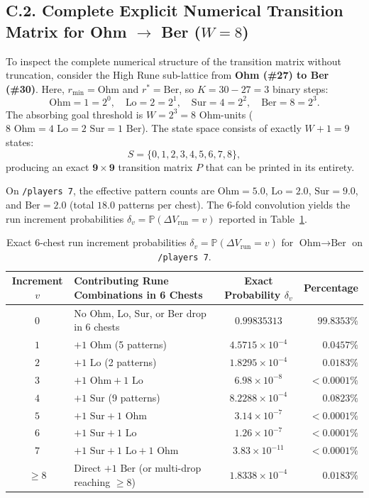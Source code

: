 \documentclass[11pt,reqno]{amsart}
\theoremstyle{definition}
\begin{document}
\subsection{C.2. Complete Explicit Numerical Transition Matrix for Ohm $\to$ Ber ($W = 8$)}
To inspect the complete numerical structure of the transition matrix without truncation, consider the High Rune sub-lattice from \textbf{Ohm (\#27) to Ber (\#30)}. Here, $r_{\min} = \text{Ohm}$ and $r^* = \text{Ber}$, so $K = 30 - 27 = 3$ binary steps:
\[
    \text{Ohm} = 1 = 2^0, \quad \text{Lo} = 2 = 2^1, \quad \text{Sur} = 4 = 2^2, \quad \text{Ber} = 8 = 2^3.
\]
The absorbing goal threshold is $W = 2^3 = 8$ Ohm-units ($8\text{ Ohm} = 4\text{ Lo} = 2\text{ Sur} = 1\text{ Ber}$). The state space consists of exactly $W + 1 = 9$ states:
\[
    S = \{0, 1, 2, 3, 4, 5, 6, 7, 8\},
\]
producing an exact $\mathbf{9 \times 9}$ transition matrix $P$ that can be printed in its entirety.

On \texttt{/players~7}, the effective pattern counts are $\text{Ohm} = 5.0$, $\text{Lo} = 2.0$, $\text{Sur} = 9.0$, and $\text{Ber} = 2.0$ (total $18.0$ patterns per chest). The $6$-fold convolution yields the run increment probabilities $\delta_v = \mathbb{P}(\Delta V_{\text{run}} = v)$ reported in Table~\ref{tab:app_ohm_deltas}.

\begin{table}[htbp]
\centering
\caption{Exact $6$-chest run increment probabilities $\delta_v = \mathbb{P}(\Delta V_{\text{run}} = v)$ for $\text{Ohm}\to\text{Ber}$ on \texttt{/players~7}.}
\label{tab:app_ohm_deltas}
\footnotesize
\begin{tabular}{@{}c l c r@{}}
\toprule
Increment $v$ & Contributing Rune Combinations in 6 Chests & Exact Probability $\delta_v$ & Percentage \\
\midrule
$0$ & No Ohm, Lo, Sur, or Ber drop in 6 chests & $0.99835313$ & $99.8353\%$ \\
$1$ & $+1\text{ Ohm}$ (5 patterns)              & $4.5715 \times 10^{-4}$ & $0.0457\%$ \\
$2$ & $+1\text{ Lo}$ (2 patterns)                & $1.8295 \times 10^{-4}$ & $0.0183\%$ \\
$3$ & $+1\text{ Ohm} + 1\text{ Lo}$             & $6.98 \times 10^{-8}$   & $< 0.0001\%$ \\
$4$ & $+1\text{ Sur}$ (9 patterns)              & $8.2288 \times 10^{-4}$ & $0.0823\%$ \\
$5$ & $+1\text{ Sur} + 1\text{ Ohm}$            & $3.14 \times 10^{-7}$   & $< 0.0001\%$ \\
$6$ & $+1\text{ Sur} + 1\text{ Lo}$             & $1.26 \times 10^{-7}$   & $< 0.0001\%$ \\
$7$ & $+1\text{ Sur} + 1\text{ Lo} + 1\text{ Ohm}$ & $3.83 \times 10^{-11}$ & $< 0.0001\%$ \\
$\ge 8$ & Direct $+1\text{ Ber}$ (or multi-drop reaching $\ge 8$) & $1.8338 \times 10^{-4}$ & $0.0183\%$ \\
\bottomrule
\end{tabular}
\end{table}
\end{document}
